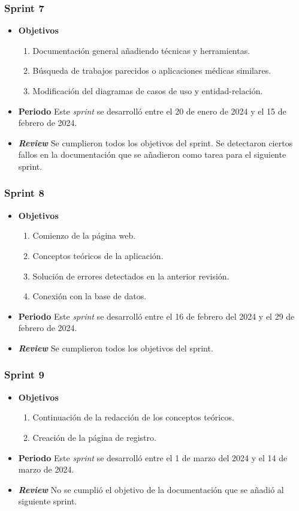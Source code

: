 \subsubsection{Sprint 7}
\begin{itemize}
\item \textbf{Objetivos}
\begin{enumerate}
\item Documentación general añadiendo técnicas y herramientas.
\item Búsqueda de trabajos parecidos o aplicaciones médicas similares.
\item Modificación del diagramas de casos de uso y entidad-relación.
\end{enumerate}
\item \textbf{Periodo}
Este \textsl{sprint} se desarrolló entre el 20 de enero de 2024 y el 15 de febrero de 2024.
\item \textbf{\textsl{Review}}
Se cumplieron todos los objetivos del sprint. Se detectaron ciertos fallos en la documentación que se añadieron como tarea para el siguiente sprint. 


\end{itemize}
\subsubsection{Sprint 8}
\begin{itemize}
\item \textbf{Objetivos}
\begin{enumerate}
\item Comienzo de la página web.
\item Conceptos teóricos de la aplicación.
\item Solución de errores detectados en la anterior revisión.
\item Conexión con la base de datos.
\end{enumerate}
\item \textbf{Periodo}
Este \textsl{sprint} se desarrolló entre el 16 de febrero del 2024 y el 29 de febrero de 2024.
\item \textbf{\textsl{Review}}
Se cumplieron todos los objetivos del sprint. 
\end{itemize}

\subsubsection{Sprint 9}
\begin{itemize}
\item \textbf{Objetivos}
\begin{enumerate}
\item Continuación de la redacción de los conceptos teóricos.
\item Creación de la página de registro.
\end{enumerate}
\item \textbf{Periodo}
Este \textsl{sprint} se desarrolló entre el 1 de marzo del 2024 y el 14 de marzo de 2024.
\item \textbf{\textsl{Review}}
No se cumplió el objetivo de la documentación que se añadió al siguiente sprint. 
\end{itemize}

